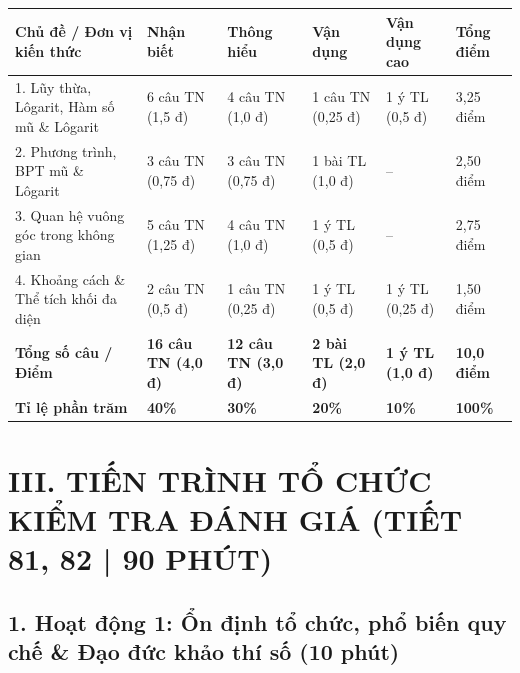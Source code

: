 \documentclass[12pt, a4paper]{article}
\begin{document}
\begin{center}
\begin{tabularx}{\textwidth}{|p{4.5cm}|X|X|X|X|X|}
\hline
\textbf{Chủ đề / Đơn vị kiến thức} & \textbf{Nhận biết} & \textbf{Thông hiểu} & \textbf{Vận dụng} & \textbf{Vận dụng cao} & \textbf{Tổng điểm} \\ \hline
1. Lũy thừa, Lôgarit, Hàm số mũ \& Lôgarit & 6 câu TN (1,5 đ) & 4 câu TN (1,0 đ) & 1 câu TN (0,25 đ) & 1 ý TL (0,5 đ) & 3,25 điểm \\ \hline
2. Phương trình, BPT mũ \& Lôgarit & 3 câu TN (0,75 đ) & 3 câu TN (0,75 đ) & 1 bài TL (1,0 đ) & – & 2,50 điểm \\ \hline
3. Quan hệ vuông góc trong không gian & 5 câu TN (1,25 đ) & 4 câu TN (1,0 đ) & 1 ý TL (0,5 đ) & – & 2,75 điểm \\ \hline
4. Khoảng cách \& Thể tích khối đa diện & 2 câu TN (0,5 đ) & 1 câu TN (0,25 đ) & 1 ý TL (0,5 đ) & 1 ý TL (0,25 đ) & 1,50 điểm \\ \hline
\textbf{Tổng số câu / Điểm} & \textbf{16 câu TN (4,0 đ)} & \textbf{12 câu TN (3,0 đ)} & \textbf{2 bài TL (2,0 đ)} & \textbf{1 ý TL (1,0 đ)} & \textbf{10,0 điểm} \\ \hline
\textbf{Tỉ lệ phần trăm} & \textbf{40\%} & \textbf{30\%} & \textbf{20\%} & \textbf{10\%} & \textbf{100\%} \\ \hline
\end{tabularx}
\end{center}

\section*{III. TIẾN TRÌNH TỔ CHỨC KIỂM TRA ĐÁNH GIÁ (TIẾT 81, 82 | 90 PHÚT)}

\subsection*{1. Hoạt động 1: Ổn định tổ chức, phổ biến quy chế \& Đạo đức khảo thí số (10 phút)}
\end{document}
